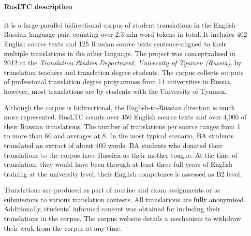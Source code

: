 \paragraph{RusLTC description} It is a large parallel bidirectional corpus of student translations in the English-Russian language pair, counting over 2.3 mln word tokens in total. It includes 402 English source texts and 125 Russian source texts sentence-aligned to their multiple translations in the other language. The project was conceptualised in 2012 at the \textit{Translation Studies Department, University of Tyumen (Russia)}, by translation teachers and translation degree students. The corpus collects outputs of professional translation degree programmes from 14 universities in Russia, however, most translations are by students with the University of Tyumen. %

Although the corpus is bidirectional, the English-to-Russian direction is much more represented. RusLTC counts over 450 English source texts and over 4,000 of their Russian translations. The number of translations per source ranges from 1 to more than 60 and averages at 8. In the most typical scenario, BA students translated an extract of about 400 words. BA students who donated their translations to the corpus have Russian as their mother tongue. At the time of translation, they would have been through at least three full years of English training at the university level, their English competence is assessed as B2 level.

Translations are produced as part of routine and exam assignments or as submissions to various translation contests. %
All translations are fully anonymised. Additionally, students' informed consent was obtained for including their translations in the corpus. The corpus website details a mechanism to withdraw their work from the corpus at any time.

